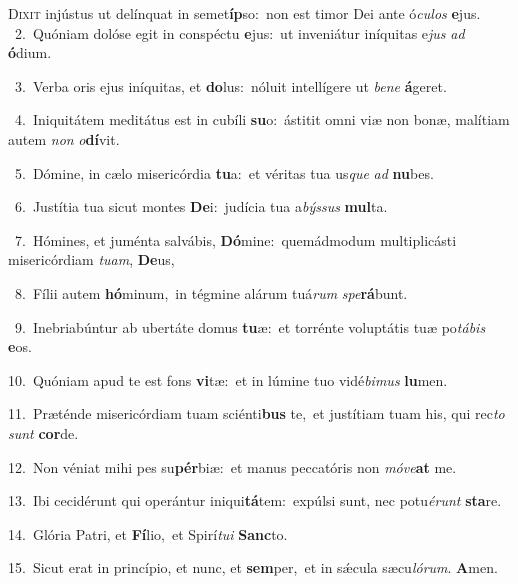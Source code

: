 \lettrine{\initial\textcolor{\initialcolor}{D}}{ixit} injústus ut delínquat in semet\-\textbf{íp}\-so:~\star non est timor Dei ante ó\-\textit{cu}\-\textit{los} \textbf{e}\-jus.\\
{\numbfont\textcolor{\numbcolor}{~2.}}~Quóniam dolóse egit in conspéctu \textbf{e}\-jus:~\star ut inveniátur iníquitas e\textit{jus} \textit{ad} \textbf{ó}\-dium.\par
{\numbfont\textcolor{\numbcolor}{~3.}}~Verba oris ejus iníquitas, et \textbf{do}\-lus:~\star nóluit intellígere ut \textit{be}\-\textit{ne} \textbf{á}\-geret.\par
{\numbfont\textcolor{\numbcolor}{~4.}}~Iniquitátem meditátus est in cubíli \textbf{su}\-o:~\star ástitit omni viæ non bonæ, malítiam autem \textit{non} \textit{o}\-\textbf{dí}vit.\par
{\numbfont\textcolor{\numbcolor}{~5.}}~Dómine, in cælo misericórdia \textbf{tu}\-a:~\star et véritas tua us\textit{que} \textit{ad} \textbf{nu}\-bes.\par
{\numbfont\textcolor{\numbcolor}{~6.}}~Justítia tua sicut montes \textbf{De}\-i:~\star judícia tua a\-\textit{býs}\-\textit{sus} \textbf{mul}\-ta.\par
{\numbfont\textcolor{\numbcolor}{~7.}}~Hómines, et juménta salvábis, \textbf{Dó}\-mine:~\star quemádmodum multiplicásti misericórdiam \textit{tu}\-\textit{am}, \textbf{De}\-us,\par
{\numbfont\textcolor{\numbcolor}{~8.}}~Fílii autem \textbf{hó}\-minum,~\star in tégmine alárum tuá\textit{rum} \textit{spe}\-\textbf{rá}bunt.\par
{\numbfont\textcolor{\numbcolor}{~9.}}~Inebriabúntur ab ubertáte domus \textbf{tu}\-æ:~\star et torrénte voluptátis tuæ po\-\textit{tá}\-\textit{bis} \textbf{e}\-os.\par
{\numbfont\textcolor{\numbcolor}{10.}}~Quóniam apud te est fons \textbf{vi}\-tæ:~\star et in lúmine tuo vidé\-\textit{bi}\-\textit{mus} \textbf{lu}\-men.\par
{\numbfont\textcolor{\numbcolor}{11.}}~Præténde misericórdiam tuam sciénti\textbf{bus} te,~\star et justítiam tuam his, qui rec\textit{to} \textit{sunt} \textbf{cor}\-de.\par
{\numbfont\textcolor{\numbcolor}{12.}}~Non véniat mihi pes su\-\textbf{pér}\-biæ:~\star et manus peccatóris non \textit{mó}\-\textit{ve}\textbf{at} me.\par
{\numbfont\textcolor{\numbcolor}{13.}}~Ibi cecidérunt qui operántur iniqui\-\textbf{tá}\-tem:~\star expúlsi sunt, nec potu\-\textit{é}\-\textit{runt} \textbf{sta}\-re.\par
{\numbfont\textcolor{\numbcolor}{14.}}~Glória Patri, et \textbf{Fí}\-lio,~\star et Spirí\-\textit{tu}\-\textit{i} \textbf{Sanc}\-to.\par
{\numbfont\textcolor{\numbcolor}{15.}}~Sicut erat in princípio, et nunc, et \textbf{sem}\-per,~\star et in sǽcula sæcu\-\textit{ló}\-\textit{rum}. \textbf{A}\-men.\par
